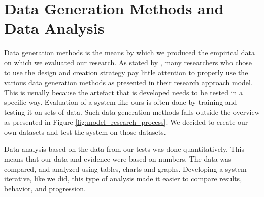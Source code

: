 
\section{Data Generation Methods and Data Analysis}
\label{sec:data_generation_methods_and_data_analysis}
Data generation methods is the means by which we produced the empirical data on which we evaluated our research. As stated by \cite{oates2005researching}, many researchers who chose to use the design and creation strategy pay little attention to properly use the various data generation methods as presented in their research approach model. This is usually because the artefact that is developed needs to be tested in a specific way. Evaluation of a system like ours is often done by training and testing it on sets of data. Such data generation methods falls outside the overview as presented in Figure \ref{fig:model_research_process}. We decided to create our own datasets and test the system on those datasets.

Data analysis based on the data from our tests was done quantitatively. This means that our data and evidence were based on numbers. The data was compared, and analyzed using tables, charts and graphs. Developing a system iterative, like we did, this type of analysis made it easier to compare results, behavior, and progression.